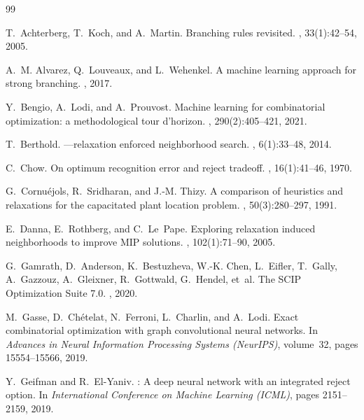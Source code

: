 \documentclass[10pt,twocolumn,letterpaper]{article}
\theoremstyle{plain}
\theoremstyle{definition}
\theoremstyle{remark}
\begin{document}
\begin{thebibliography}{99}

T.~Achterberg, T.~Koch, and A.~Martin.
\newblock Branching rules revisited.
, 33(1):42--54, 2005.

A.~M. Alvarez, Q.~Louveaux, and L.~Wehenkel.
\newblock A machine learning approach for strong branching.
, 2017.

Y.~Bengio, A.~Lodi, and A.~Prouvost.
\newblock Machine learning for combinatorial optimization: a methodological tour d'horizon.
, 290(2):405--421, 2021.

T.~Berthold.
---relaxation enforced neighborhood search.
, 6(1):33--48, 2014.

C.~Chow.
\newblock On optimum recognition error and reject tradeoff.
, 16(1):41--46, 1970.

G.~Cornu{\'e}jols, R.~Sridharan, and J.-M. Thizy.
\newblock A comparison of heuristics and relaxations for the capacitated plant location problem.
, 50(3):280--297, 1991.

E.~Danna, E.~Rothberg, and C.~Le~Pape.
\newblock Exploring relaxation induced neighborhoods to improve {MIP} solutions.
, 102(1):71--90, 2005.

G.~Gamrath, D.~Anderson, K.~Bestuzheva, W.-K. Chen, L.~Eifler, T.~Gally, A.~Gazzouz, A.~Gleixner, R.~Gottwald, G.~Hendel, et~al.
\newblock The {SCIP} Optimization Suite 7.0.
, 2020.

M.~Gasse, D.~Ch{\'e}telat, N.~Ferroni, L.~Charlin, and A.~Lodi.
\newblock Exact combinatorial optimization with graph convolutional neural networks.
\newblock In {\em Advances in Neural Information Processing Systems (NeurIPS)}, volume~32, pages 15554--15566, 2019.

Y.~Geifman and R.~El-Yaniv.
: A deep neural network with an integrated reject option.
\newblock In {\em International Conference on Machine Learning (ICML)}, pages 2151--2159, 2019.


\end{thebibliography}
\end{document}
